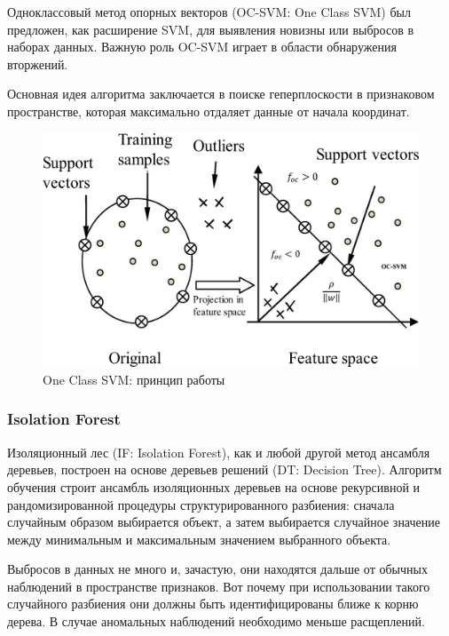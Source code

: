\documentclass[12pt]{article}
\begin{document}
    \par Одноклассовый метод опорных векторов (OC-SVM: One Class SVM) был предложен, как расширение SVM, для выявления новизны или выбросов в наборах данных. Важную роль OC-SVM играет в области обнаружения вторжений.

    \par Основная идея алгоритма заключается в поиске геперплоскости в признаковом пространстве, которая максимально отдаляет данные от начала координат.

    \begin{figure}[h!]
        \centering
        \includegraphics[width=0.8\linewidth]{OneClassSVM.png}
        \caption{One Class SVM: принцип работы}
        \label{sec:Research:Model:OneClassSVM:fig:OneClassSVM}
    \end{figure}


    \subsubsection{Isolation Forest}
    \label{sec:Research:Model:IsolationForest}

    \par Изоляционный лес (IF: Isolation Forest), как и любой другой метод ансамбля деревьев, построен на основе деревьев решений (DT: Decision Tree). Алгоритм обучения строит ансамбль изоляционных деревьев на основе рекурсивной и рандомизированной процедуры структурированного разбиения: сначала случайным образом выбирается объект, а затем выбирается случайное значение между минимальным и максимальным значением выбранного объекта.

    \par Выбросов в данных не много и, зачастую, они находятся дальше от обычных наблюдений в пространстве признаков. Вот почему при использовании такого случайного разбиения они должны быть идентифицированы ближе к корню дерева. В случае аномальных наблюдений необходимо меньше расщеплений.
\end{document}
